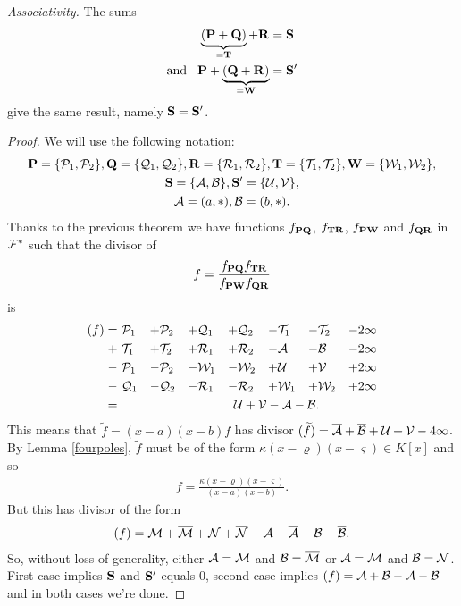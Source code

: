 \documentclass[english,11pt,a4paper]{article}
\begin{document}
\begin{theorem}
  \textit{Associativity.} The sums
  \begin{align*}
  \underbrace{(\P + \Q)}_{= \T} + \R &= \S \\
  \text{and\hspace{3mm}}\P + \underbrace{(\Q + \R)}_{=\W} &= \S'
  \end{align*}
  give the same result, namely $\S = \S'$.

  \begin{proof}
    We will use the following notation:
    \begin{gather*}
    \P=\{\p_1,\p_2\}, 
    \Q=\{\q_1,\q_2\}, 
    \R=\{\r_1,\r_2\}, 
    \T=\{\t_1,\t_2\}, 
    \W=\{\w_1,\w_2\},
    \\
    \S = \{\a, \b \}, 
    \S' = \{\u, \v \},
    \\
    \a = (a,*), \b = (b,*).
    \end{gather*}
    Thanks to the previous theorem we have functions $f_{\P \Q}$, $f_{\T \R}$, $f_{\P \W}$ and $f_{\Q \R}$ in $\F^*$ such that the divisor of
    \begin{align*}
      f = \frac{f_{\P \Q} f_{\T \R}}{f_{\P \W} f_{\Q \R}} 
    \end{align*}
    is\vspace{-8mm}
    \begin{alignat*}{7}
      (f)
      = & \ \p_1 &+{}& \p_2 &+{}& \q_1 &+{}& \q_2 &-{}& \t_1 &-{}& \t_2 &-{}& 2 \infty \\
      + & \ \t_1 &+{}& \t_2 &+{}& \r_1 &+{}& \r_2 &-{}& \a   &-{}& \b   &-{}& 2 \infty \\
      - & \ \p_1 &-{}& \p_2 &-{}& \w_1 &-{}& \w_2 &+{}& \u   &+{}& \v   &+{}& 2 \infty \\
      - & \ \q_1 &-{}& \q_2 &-{}& \r_1 &-{}& \r_2 &+{}& \w_1 &+{}& \w_2 &+{}& 2 \infty \\
      = &&&&&&&&&&&&& \hspace{-35mm} \u + \v - \a - \b.
    \end{alignat*}
    This means that $\tilde f = (x-a)(x-b)f$ has divisor $(\tilde f) = \bar \a + \bar \b+ \u + \v - 4 \infty$. By Lemma \ref{fourpoles}, $\tilde f$ must be of the form $\kappa (x-\varrho)(x-\varsigma) \in \bar K [x]$ and so
  \begin{align*}
    f=\frac{\kappa (x-\varrho)(x-\varsigma)}{(x-a)(x-b)}.
  \end{align*}
  But this has divisor of the form
  \begin{align*}
    (f) = \m + \bar \m + \n + \bar \n - \a - \bar \a - \b - \bar \b.
  \end{align*}
  So, without loss of generality, either $\a = \m$ and $\b = \bar \m$ or $\a = \m$ and $\b = \n$. First case implies $\S$ and $\S'$ equals 0, second case implies $(f)= \a + \b - \a - \b$ and in both cases we're done.
  \end{proof}

\end{theorem}
\end{document}
